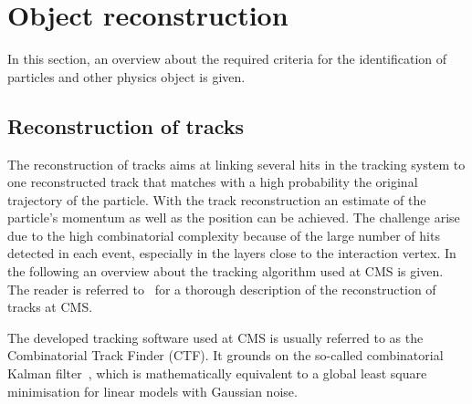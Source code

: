 \section{Object reconstruction}
\label{sec:ObjectReconstruction}
In this section, an overview about the required criteria for the identification of particles and other physics object is given.
\subsection*{Reconstruction of tracks}
The reconstruction of tracks aims at linking several hits in the tracking system to one reconstructed track that matches with a high probability the original trajectory of the particle.
With the track reconstruction an estimate of the particle's momentum as well as the position can be achieved.
The challenge arise due to the high combinatorial complexity because of the large number of hits detected in each event, especially in the layers close to the interaction vertex.
In the following an overview about the tracking algorithm used at CMS is given.
The reader is referred to~\cite{bib:CMS:tracking_8TeV} for a thorough description of the reconstruction of tracks at CMS.

The developed tracking software used at CMS is usually referred to as the Combinatorial Track Finder (CTF).
It grounds on the so-called combinatorial Kalman filter~\cite{bib:TrackAlgorithm_1989,bib:TrackAlgorithm_1990,bib:TrackAlgorithm_1997}, which is mathematically equivalent to a global least square minimisation for linear models with Gaussian noise.

